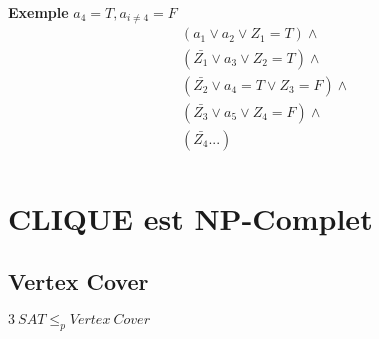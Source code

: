 \documentclass[a4paper,12pt]{article}
\begin{document}
    \textbf{Exemple}
    $a_4 = T, a_{i \neq 4} = F$
    \begin{align*}
      &(a_1 \vee a_2 \vee Z_1 \mathit{= T}) \wedge \\
      &(\bar{Z_1} \vee a_3 \vee Z_2 \mathit{= T}) \wedge \\
      &(\bar{Z_2} \vee a_4 \mathit{= T} \vee Z_3 \mathit{= F}) \wedge \\
      &(\bar{Z_3} \vee a_5\vee Z_4 \mathit{= F}) \wedge \\
      &(\bar{Z_4} ...) \\
    \end{align*}
    
    
\section{CLIQUE est NP-Complet}
  
  \subsection{Vertex Cover}
    $3\ SAT \leq_p Vertex\ Cover$
    
\end{document}
